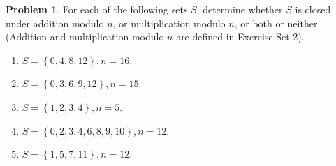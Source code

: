 \documentclass[10pt]{article}
\theoremstyle{definition}
\newtheorem{problem}{Problem}
\begin{document}
\begin{problem}
For each of the following sets $S$, determine whether $S$ is closed under
addition modulo $n$, or multiplication modulo $n$, or both or neither.
(Addition and multiplication modulo $n$ are defined in Exercise Set 2).
\begin{enumerate}[label=(\alph*)]
  \item $S=\left\{0,4,8,12\right\},n=16$.
  \item $S=\left\{0,3,6,9,12\right\},n=15$.
  \item $S=\left\{1,2,3,4\right\},n=5$.
  \item $S=\left\{0,2,3,4,6,8,9,10\right\},n=12$.
  \item $S=\left\{1,5,7,11\right\},n=12$.
\end{enumerate}
\end{problem}
\end{document}
